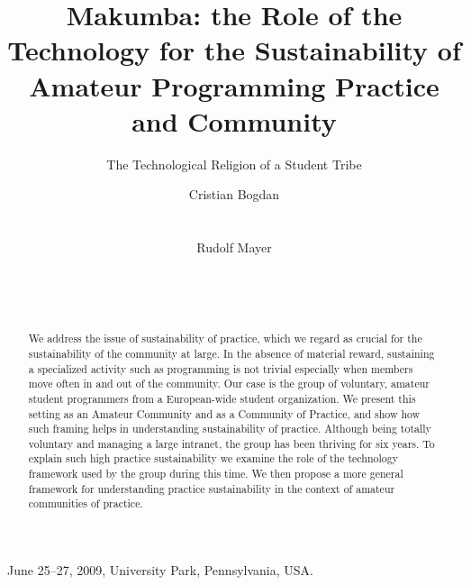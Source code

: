 \documentclass{sig-alt-release2}
\begin{document}
 {June 25--27, 2009, University Park, Pennsylvania, USA.} 



\title{Makumba: the Role of the Technology for the Sustainability of Amateur Programming Practice and Community}
\subtitle{The Technological Religion of a Student Tribe}

 \author{
 \alignauthor
 Cristian Bogdan\\
        \\
        \\
 \alignauthor
 Rudolf Mayer\\
        \\
        \\
        \\
 }

\maketitle
\begin{abstract}
We address the issue of sustainability of practice, which we regard as crucial for the sustainability of the community at large. In the absence of material reward, sustaining a specialized activity such as programming is not trivial especially when members move often in and out of the community. Our case is the group of voluntary, amateur student programmers from a European-wide student organization. We present this setting as an Amateur Community and as a Community of Practice, and show how such framing helps in understanding sustainability of practice. Although being totally voluntary and managing a large intranet, the group has been thriving for six years. To explain such high practice sustainability we examine the role of the technology framework used by the group during this time. We then propose a more general framework for understanding practice sustainability in the context of amateur communities of practice. 
\end{abstract}

\end{document}
